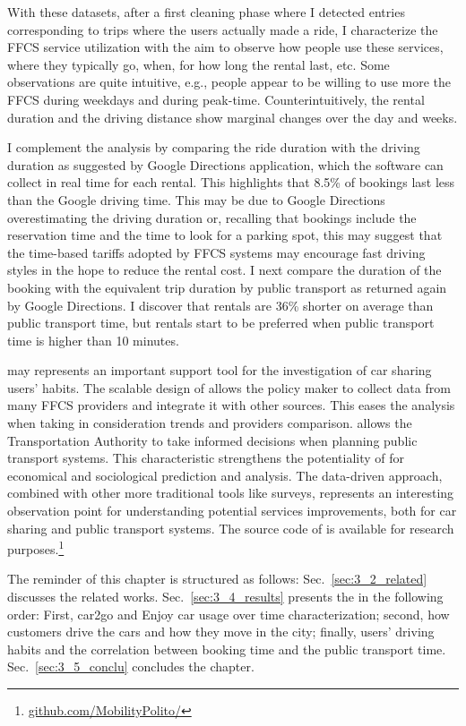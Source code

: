 With these datasets, after a first cleaning phase where I detected entries corresponding to trips where the users actually made a ride, I characterize the FFCS service utilization with the aim to observe how people use these services, where they typically go, when, for how long the rental last, etc. Some observations are quite intuitive, e.g., people appear to be willing to use more the FFCS during weekdays and during peak-time. Counterintuitively, the rental duration and the driving distance show marginal changes over the day and weeks.

I complement the analysis by comparing the ride duration with the driving duration as suggested by Google Directions application, which the software can collect in real time for each rental. This highlights that 8.5\% of bookings last less than the Google driving time. 
This may be due to Google Directions overestimating the driving duration or, recalling that bookings  include the reservation time and the time to look for a parking spot, this may suggest that the time-based tariffs adopted by FFCS systems may encourage fast driving styles in the hope to reduce the rental cost.
I next compare the duration of the booking with the equivalent trip duration by public transport as returned again by Google Directions. I discover that rentals are 36\% shorter on average than public transport time, but  rentals start to be preferred when public transport time is higher than 10 minutes.

\tool may represents an important support tool for the investigation of car sharing users' habits. The scalable design of \tool allows the policy maker to collect data from many FFCS providers  and integrate it with other sources. This eases the analysis when taking in consideration trends and providers comparison. \tool allows the Transportation Authority to take informed decisions when planning public transport systems. This characteristic strengthens the potentiality of \tool for economical and sociological prediction and analysis. The data-driven approach, combined with other more traditional tools like surveys, represents an interesting observation point for understanding potential services improvements, both for car sharing and public transport systems. The source code of \tool  is available for research purposes.\footnote{\url{github.com/MobilityPolito/}}

The reminder of this chapter is structured as follows: Sec.~\ref{sec:3_2_related} discusses the related works. Sec.~\ref{sec:3_4_results} presents the in the following order: First, car2go and Enjoy car usage over time characterization; second, how customers drive the cars and how they move in the city; finally, users' driving habits and the correlation between booking time and the public transport time. Sec.~\ref{sec:3_5_conclu} concludes the chapter.


